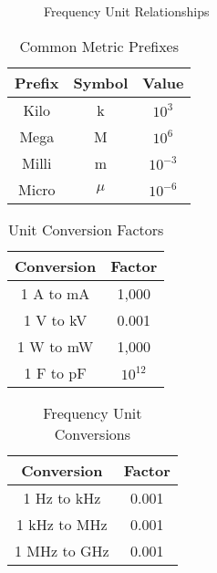 \begin{figure}[htbp]
    \centering
    \caption{Frequency Unit Relationships}
    \label{fig:frequency-units}
\end{figure}

\begin{table}[htbp]
    \centering
    \caption{Common Metric Prefixes}
    \label{tab:metric-prefixes}
    \begin{tabular}{|c|c|c|}
        \hline
        Prefix & Symbol & Value \\
        \hline
        Kilo & k & $10^3$ \\
        Mega & M & $10^6$ \\
        Milli & m & $10^{-3}$ \\
        Micro & $\mu$ & $10^{-6}$ \\
        \hline
    \end{tabular}
\end{table}

\begin{table}[htbp]
    \centering
    \caption{Unit Conversion Factors}
    \label{tab:unit-conversion-factors}
    \begin{tabular}{|c|c|}
        \hline
        Conversion & Factor \\
        \hline
        1 A to mA & 1,000 \\
        1 V to kV & 0.001 \\
        1 W to mW & 1,000 \\
        1 F to pF & $10^{12}$ \\
        \hline
    \end{tabular}
\end{table}

\begin{table}[htbp]
    \centering
    \caption{Frequency Unit Conversions}
    \label{tab:frequency-conversions}
    \begin{tabular}{|c|c|}
        \hline
        Conversion & Factor \\
        \hline
        1 Hz to kHz & 0.001 \\
        1 kHz to MHz & 0.001 \\
        1 MHz to GHz & 0.001 \\
        \hline
    \end{tabular}
\end{table}

